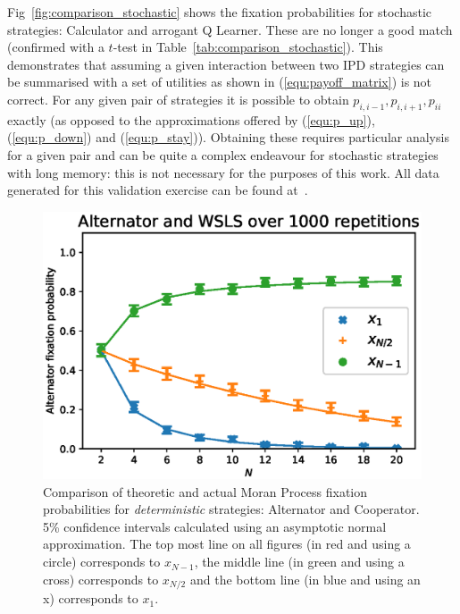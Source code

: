 \documentclass[10pt,letterpaper]{article}
\begin{document}
Fig~\ref{fig:comparison_stochastic} shows the fixation probabilities for
stochastic strategies: Calculator and arrogant Q Learner. These are no longer a
good match (confirmed with a \(t\)-test in
Table~\ref{tab:comparison_stochastic}). This demonstrates that assuming
a given interaction between two IPD strategies can be summarised with a set of
utilities as shown in (\ref{equ:payoff_matrix}) is not correct. For any given pair of
strategies it is possible to obtain \(p_{i,i-1}, p_{i,i+1}, p_{ii}\) exactly (as
opposed to the approximations offered by (\ref{equ:p_up}), (\ref{equ:p_down})
and (\ref{equ:p_stay})). Obtaining these requires particular analysis for a
given pair and can be quite a complex endeavour for stochastic strategies with
long memory: this is not necessary for the purposes of this work. All data
generated for this validation exercise can be found at~\cite{data}.

\begin{figure}[!hbtp]
    \centering
    \includegraphics[draft, draft, width=.95\columnwidth]{./Fig1.eps}
    \caption{Comparison of theoretic and actual Moran Process fixation
             probabilities for \textit{deterministic} strategies: Alternator and
         Cooperator. 5\% confidence intervals calculated using an asymptotic
     normal approximation.
The top most line on all figures (in red and using a circle) corresponds to
\(x_{N-1}\), the middle line (in green and using a cross) corresponds to
\(x_{N/2}\) and the bottom line (in blue and using an x) corresponds to
\(x_{1}\).}
    \label{fig:comparison_deterministic}
\end{figure}
\end{document}
